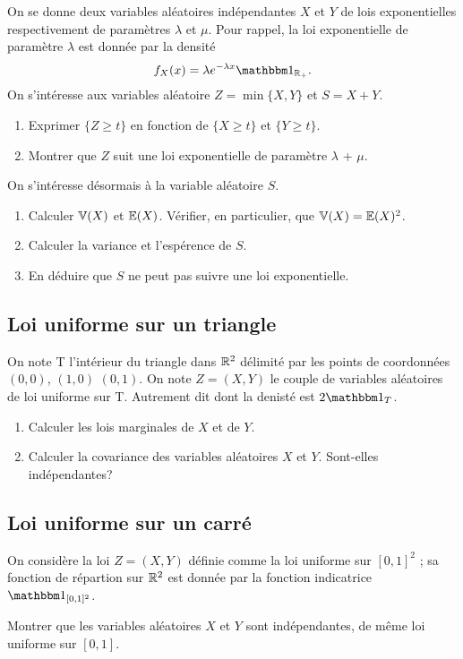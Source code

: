 \documentclass[11pt, a4paper]{article}
\begin{document}
On se donne deux variables aléatoires indépendantes $X$ et $Y$ de lois
exponentielles respectivement de paramètres $\lambda$ et $\mu$. Pour
rappel, la loi exponentielle de paramètre $\lambda$ est donnée par la
densité
\[
f_X(x) = \lambda e^{-\lambda x}\bOne_{\R_+}.
\]
On s'intéresse aux variables aléatoire $Z = \min\{X, Y\}$ et $S = X+Y$.
\begin{question}{3}
  \begin{enumerate}
  \item Exprimer $\{Z \geq t \}$ en fonction de $\{ X \geq t\}$ et
    $\{Y \geq t\}$.
  \item Montrer que $Z$ suit une loi exponentielle de paramètre
    $\lambda$ + $\mu$.
  \end{enumerate}
\end{question}
On s'intéresse désormais à la variable aléatoire $S$.
\begin{question}{4}
  \begin{enumerate}
  \item Calculer $\mathbb{V}(X)$ et $\mathbb{E}(X)$. Vérifier, en particulier, que $\mathbb{V}(X) = \mathbb{E}(X)^2$.
  \item Calculer la variance et l'espérence de $S$.
  \item En déduire que $S$ ne peut pas suivre une loi exponentielle.
  \end{enumerate}
\end{question}


\subsection{Loi uniforme sur un triangle}

On note T l'intérieur du triangle dans $\mathbb{R}^2$ délimité par les points
de coordonnées $(0,0)$, $(1,0)$ $(0,1)$. On note $Z = (X, Y)$ le
couple de variables aléatoires de loi uniforme sur T. Autrement dit
dont la denisté est $2\bOne_T$.

\begin{question}{4}
  \begin{enumerate}
  \item Calculer les lois marginales de $X$ et de $Y$.
  \item Calculer la covariance des variables aléatoires $X$ et
    $Y$. Sont-elles indépendantes?
  \end{enumerate}
\end{question}

\subsection{Loi uniforme sur un carré}

On considère la loi $Z = (X, Y)$ définie comme la loi uniforme sur
$[0, 1]^2$ ; sa fonction de répartion sur $\mathbb{R}^2$ est donnée par la
fonction indicatrice $\bOne_{[0,1]^2}$.
\begin{question}{4}
  Montrer que les variables aléatoires  $X$ et $Y$ sont indépendantes,
  de même loi uniforme sur $[0, 1]$.
\end{question}
\end{document}
